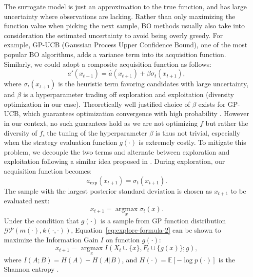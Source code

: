 The surrogate model is just an approximation to the true function, and has large uncertainty where observations are lacking. Rather than only maximizing the function value when picking the next sample, BO methods usually also take into consideration the estimated uncertainty to avoid being overly greedy. For example, GP-UCB (Gaussian Process Upper Confidence Bound), one of the most popular BO algorithms, adds a variance term into its acquisition function. Similarly, we could adopt a composite acquisition function as follows: 
\begin{equation}\label{eq:diversity-ucb}
    a'(x_{t+1}) = \hat{a}(x_{t+1}) + \beta\sigma_t(x_{t+1}),
\end{equation}
where $\sigma_t(x_{t+1})$ is the heuristic term favoring candidates with large uncertainty, and $\beta$ is a hyperparameter trading off exploration and exploitation (diversity optimization in our case). Theoretically well justified choice of $\beta$ exists for GP-UCB, which guarantees optimization convergence with high probability \cite{GP-bandit}. However in our context, no such guarantees hold as we are not optimizing $f$ but rather the diversity of $f$, the tuning of the hyperparameter $\beta$ is thus not trivial, especially when the strategy evaluation function $g(\cdot)$ is extremely costly. To mitigate this problem, we decouple the two terms and alternate between exploration and exploitation following a similar idea proposed in \cite{alternative-explore-exploit}. During exploration, our acquisition function becomes:
\begin{equation}\label{eq:explore-acquisition}
    a_\text{exp}(x_{t+1}) = \sigma_t(x_{t+1}).
\end{equation}
The sample with the largest posterior standard deviation is chosen as $x_{t+1}$ to be evaluated next:
\begin{equation}\label{eq:explore-formula-2}
    x_{t+1} = \mathop{\arg\max}\limits_{x}\sigma_t(x).
\end{equation}
Under the condition that $g(\cdot)$ is a sample from GP function distribution $\mathcal{GP}(m(\cdot), k(\cdot,\cdot))$, Equation~\ref{eq:explore-formula-2} can be shown to maximize the Information Gain $I$ on function $g(\cdot)$:
\begin{equation}\label{eq:explore-formula-1}
    x_{t+1} = \mathop{\arg\max}\limits_{x}I\left(X_t \cup \{x\}, F_t \cup \{g(x)\} ; g\right),
\end{equation}
where $I(A;B)=H(A)-H(A|B)$, and $H(\cdot)=\mathbb{E}\left[-\log p(\cdot)\right]$ is the Shannon entropy \cite{information-theory}. 

